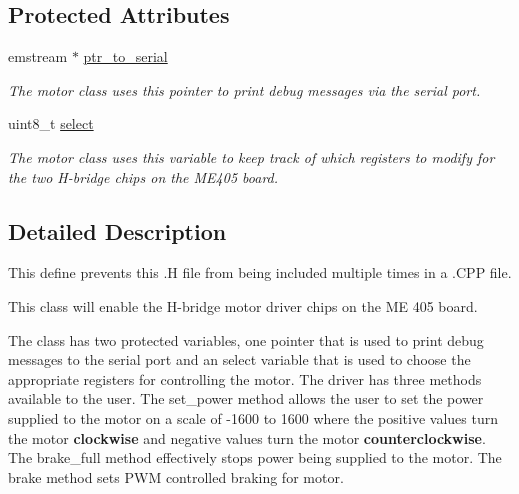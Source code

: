 \subsection*{Protected Attributes}
\begin{DoxyCompactItemize}
\item 
\hypertarget{classmotor__drv_a9cd3052255589d1849217279b4b6e337}{emstream $\ast$ \hyperlink{classmotor__drv_a9cd3052255589d1849217279b4b6e337}{ptr\-\_\-to\-\_\-serial}}\label{classmotor__drv_a9cd3052255589d1849217279b4b6e337}

\begin{DoxyCompactList}\small\item\em The motor class uses this pointer to print debug messages via the serial port. \end{DoxyCompactList}\item 
\hypertarget{classmotor__drv_aca3c3dd889fd865607e312faf0e76c65}{uint8\-\_\-t \hyperlink{classmotor__drv_aca3c3dd889fd865607e312faf0e76c65}{select}}\label{classmotor__drv_aca3c3dd889fd865607e312faf0e76c65}

\begin{DoxyCompactList}\small\item\em The motor class uses this variable to keep track of which registers to modify for the two H-\/bridge chips on the M\-E405 board. \end{DoxyCompactList}\end{DoxyCompactItemize}


\subsection{Detailed Description}
This define prevents this .H file from being included multiple times in a .C\-P\-P file. 

This class will enable the H-\/bridge motor driver chips on the M\-E 405 board.

The class has two protected variables, one pointer that is used to print debug messages to the serial port and an select variable that is used to choose the appropriate registers for controlling the motor. The driver has three methods available to the user. The set\-\_\-power method allows the user to set the power supplied to the motor on a scale of -\/1600 to 1600 where the positive values turn the motor {\bfseries clockwise} and negative values turn the motor {\bfseries counterclockwise}. The brake\-\_\-full method effectively stops power being supplied to the motor. The brake method sets P\-W\-M controlled braking for motor. 

